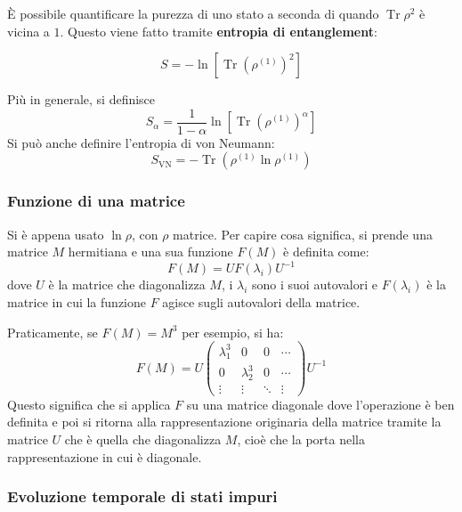 \documentclass[11pt, a4paper]{scrartcl} %
\numberwithin{equation}{subsection}
\theoremstyle{style2}
\theoremstyle{style1}
\newenvironment{boxenv}[1][]{
    \begin{eqbox}[#1]
    }{
   \end{eqbox}
}
\begin{document}
\`E possibile quantificare la purezza di uno stato a seconda di quando $\operatorname{Tr} \rho ^2$ \`e vicina a $1$. 
Questo viene fatto tramite \textbf{entropia di entanglement}:
\begin{boxenv}[]
\begin{equation}
	S = - \ln \left[ \operatorname{Tr} \left(\rho ^{(1)} \right) ^2 \right] 
\end{equation}
\end{boxenv}
Pi\`u in generale, si definisce 
\begin{equation}
	S_\alpha = \frac{1}{1-\alpha } \ln \left[ \operatorname{Tr} \left(\rho^{(1)}  \right) ^\alpha  \right] 
\end{equation}
Si pu\`o anche definire l'entropia di von Neumann:
\begin{equation}
	S_\text{VN} = - \operatorname{Tr} \left(\rho ^{(1)} \ln\rho ^{(1)} \right) 
\end{equation}
\subsubsection{Funzione di una matrice}
Si \`e appena usato $\ln \rho $, con $\rho $ matrice. 
Per capire cosa significa, si prende una matrice $M$ hermitiana e una sua funzione $F(M)$ \`e definita come:
\begin{equation}
	F(M) = U F(\lambda _i) U^{-1} 
\end{equation}
dove $U$ \`e la matrice che diagonalizza $M$, i $\lambda _i$ sono i suoi autovalori e $F(\lambda _i)$ \`e la matrice in cui la funzione $F$ agisce sugli autovalori della matrice.

Praticamente, se $F(M) = M ^3$ per esempio, si ha:
\[
	F(M) = U \begin{pmatrix} \lambda _1^3 & 0 &0 & \cdots \\ 0& \lambda _2 ^3 & 0 &\cdots \\ \vdots & \vdots & \ddots & \vdots\end{pmatrix} U^{-1} 
\] 
Questo significa che si applica $F$ su una matrice diagonale dove l'operazione \`e ben definita e poi si ritorna alla rappresentazione originaria della matrice tramite la matrice $U$ che \`e quella che diagonalizza $M$, cio\`e che la porta nella rappresentazione in cui \`e diagonale.


\subsubsection{Evoluzione temporale di stati impuri}
\end{document}
